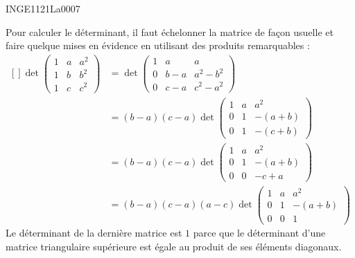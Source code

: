 

\begin{corrige}{INGE1121La0007}

	Pour calculer le déterminant, il faut échelonner la matrice de façon usuelle et faire quelque mises en évidence en utilisant des produits remarquables :
	\begin{equation}
		\begin{aligned}[]
			\det\begin{pmatrix}
				1	&	a	&	a^2	\\
				1	&	b	&	b^2	\\
				1	&	c	&	c^2
			\end{pmatrix}&=
			\det\begin{pmatrix}
				1	&	a	&	a	\\
				0	&	b-a	&	a^2-b^2	\\
				0	&	c-a	&	c^2-a^2
			\end{pmatrix}\\
			&=
			(b-a)(c-a)\det\begin{pmatrix}
				1	&	a	&	a^2	\\
				0	&	1	&	-(a+b)	\\
				0	&	1	&	-(c+b)
			\end{pmatrix}\\
			&=
			(b-a)(c-a)\det\begin{pmatrix}
				1	&	a	&	a^2	\\
				0	&	1	&	-(a+b)	\\
				0	&	0	&	-c+a
			\end{pmatrix}\\
			&=
			(b-a)(c-a)(a-c)\det\begin{pmatrix}
				1	&	a	&	a^2	\\
				0	&	1	&	-(a+b)	\\
				0	&	0	&	1
			\end{pmatrix}
		\end{aligned}
	\end{equation}
	Le déterminant de la dernière matrice est $1$ parce que le déterminant d'une matrice triangulaire supérieure est égale au produit de ses éléments diagonaux.

\end{corrige}

